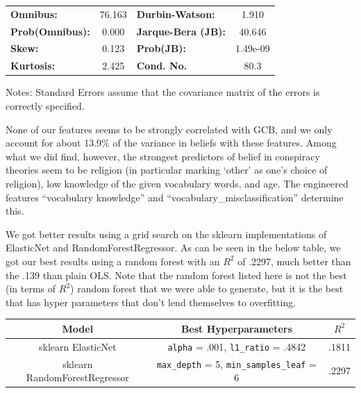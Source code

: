\documentclass[11pt]{article}
\begin{document}
\begin{center}
\begin{tabular}{lcccccc}
\bottomrule
\end{tabular}
\begin{tabular}{lclc}
\textbf{Omnibus:}       & 76.163 & \textbf{  Durbin-Watson:     } &    1.910  \\
\textbf{Prob(Omnibus):} &  0.000 & \textbf{  Jarque-Bera (JB):  } &   40.646  \\
\textbf{Skew:}          &  0.123 & \textbf{  Prob(JB):          } & 1.49e-09  \\
\textbf{Kurtosis:}      &  2.425 & \textbf{  Cond. No.          } &     80.3  \\
\bottomrule
\end{tabular}
\end{center}

Notes: \newline
 [1] Standard Errors assume that the covariance matrix of the errors is
correctly specified.

None of our features seems to be strongly correlated with GCB, and we
only account for about 13.9\% of the variance in beliefs with these
features. Among what we did find, however, the strongest predictors of
belief in conspiracy theories seem to be religion (in particular marking
`other' as one's choice of religion), low knowledge of the given
vocabulary words, and age. The engineered features ``vocabulary
knowledge'' and ``vocabulary\_misclassification'' determine this.

We got better results using a grid search on the sklearn implementations
of ElasticNet and RandomForestRegressor. As can be seen in the below
table, we got our best results using a random forest with an \(R^2\) of
.2297, much better than the .139 than plain OLS. Note that the random
forest listed here is not the best (in terms of \(R^2\)) random forest
that we were able to generate, but it is the best that has hyper
parameters that don't lend themselves to overfitting.

\begin{center}
	\begin{tabular}{ |c|c|c| } 
       \hline
       Model & Best Hyperparameters & $R^2$ \\ 
       \hline
       sklearn ElasticNet & \verb|alpha| = .001, \verb|l1_ratio| = .4842 & .1811 \\ 
       sklearn RandomForestRegressor & \verb|max_depth| = 5, \verb|min_samples_leaf| = 6 & .2297 \\
       \hline
	\end{tabular}
\end{center}
\end{document}
